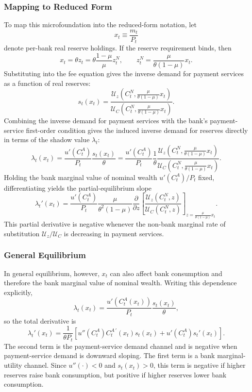 \documentclass[12pt]{article}
\begin{document}
\subsubsection*{Mapping to Reduced Form}
To map this microfoundation into the reduced-form notation, let
\[
x_t \equiv \frac{m_t}{P_t}
\]
denote per-bank real reserve holdings. If the reserve requirement binds, then
\[
x_t
=
\theta z_t
=
\theta \frac{1-\mu}{\mu} z^N_t,
\qquad
z^N_t
=
\frac{\mu}{\theta(1-\mu)}x_t.
\]
Substituting into the fee equation gives the inverse demand for payment services as a function of real reserves:
\[
s_t(x_t)
=
\frac{
\mathcal{U}_z\!\left(C^N_t,\frac{\mu}{\theta(1-\mu)}x_t\right)
}{
\mathcal{U}_C\!\left(C^N_t,\frac{\mu}{\theta(1-\mu)}x_t\right)
}.
\]
Combining the inverse demand for payment services with the bank's payment-service first-order condition gives the induced inverse demand for reserves directly in terms of the shadow value $\lambda_t$:
\[
\lambda_t(x_t)
=
\frac{u'(C^A_t)}{P_t}
\frac{s_t(x_t)}{\theta}
=
\frac{u'(C^A_t)}{P_t}
\frac{1}{\theta}
\frac{
\mathcal{U}_z\!\left(C^N_t,\frac{\mu}{\theta(1-\mu)}x_t\right)
}{
\mathcal{U}_C\!\left(C^N_t,\frac{\mu}{\theta(1-\mu)}x_t\right)
}.
\]
Holding the bank marginal value of nominal wealth $u'(C^A_t)/P_t$ fixed, differentiating yields the partial-equilibrium slope
\[
\lambda_t'(x_t)
=
\frac{u'(C^A_t)}{P_t}
\frac{\mu}{\theta^2(1-\mu)}
\frac{\partial}{\partial z}
\left[
\frac{\mathcal{U}_z(C^N_t,z)}
{\mathcal{U}_C(C^N_t,z)}
\right]_{z=\frac{\mu}{\theta(1-\mu)}x_t}.
\]
This partial derivative is negative whenever the non-bank marginal rate of substitution $\mathcal{U}_z/\mathcal{U}_C$ is decreasing in payment services.

\subsubsection*{General Equilibrium}
In general equilibrium, however, $x_t$ can also affect bank consumption and therefore the bank marginal value of nominal wealth. Writing this dependence explicitly,
\[
\lambda_t(x_t)
=
\frac{u'(C^A_t(x_t))}{P_t}\frac{s_t(x_t)}{\theta},
\]
so the total derivative is
\[
\lambda_t'(x_t)
=
\frac{1}{\theta P_t}
\left[
u''(C^A_t) C^{A\,\prime}_t(x_t)s_t(x_t)
+ u'(C^A_t)s_t'(x_t)
\right].
\]
The second term is the payment-service demand channel and is negative when payment-service demand is downward sloping. The first term is a bank marginal-utility channel. Since $u''(\cdot)<0$ and $s_t(x_t)>0$, this term is negative if higher reserves raise bank consumption, but positive if higher reserves lower bank consumption.
\end{document}
